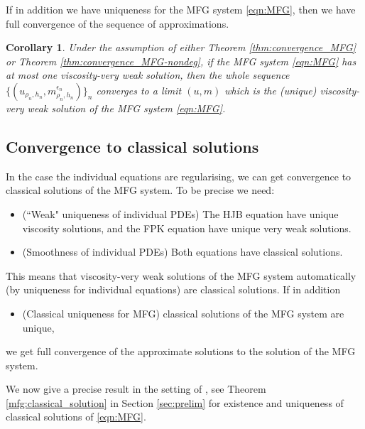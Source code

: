 \documentclass[a4paper,  twoside, 10pt, leqno]{amsart}
\newtheorem{corollary}[thm]{Corollary}
\theoremstyle{remark}
\theoremstyle{definition}
\begin{document}
If in addition we have uniqueness for the MFG system \eqref{eqn:MFG}, then we have full convergence of the sequence of approximations.

\begin{corollary} \label{corollary:mfg_convergence}
Under the assumption of either Theorem \ref{thm:convergence_MFG} or Theorem \ref{thm:convergence_MFG-nondeg}, if the MFG system \eqref{eqn:MFG} has at most one viscosity-very weak solution, then the whole 
sequence $\{(u_{\rho_n,h_n}, m^{\epsilon_n}_{\rho_n,h_n}) \}_n$ converges to a limit $(u,m)$ which is the (unique) viscosity-very weak solution of the MFG system \eqref{eqn:MFG}.   
\end{corollary} 

\subsection{Convergence to classical solutions}
In the case the individual equations are regularising, we can get convergence to classical solutions of the MFG system. To be precise we need:
\smallskip
\begin{itemize}
\item[1.] (``Weak" uniqueness of individual PDEs) The HJB equation have unique viscosity solutions, and the FPK equation have unique very weak solutions.\smallskip

\item[2.] (Smoothness of individual PDEs) Both equations have classical solutions.
\smallskip
\end{itemize}
This means that viscosity-very weak solutions of the MFG system automatically (by uniqueness for individual equations) are classical solutions.
If in addition 
\smallskip
\begin{itemize}
    \item [3.] (Classical uniqueness for MFG) classical solutions of the MFG system are unique,
\end{itemize}
we get full convergence of the approximate solutions to the solution of the MFG system.\smallskip

We now give a precise result in the setting of \cite{ersland2020classical}, see Theorem \ref{mfg:classical_solution} in Section \ref{sec:prelim} for existence and uniqueness of classical solutions of \eqref{eqn:MFG}.
\end{document}
